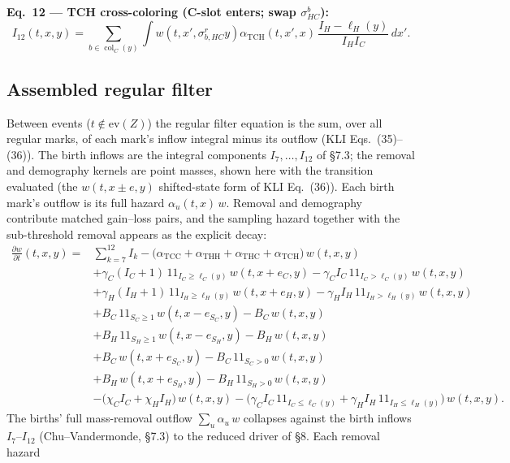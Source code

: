 \documentclass[11pt]{article}
\newcommand{\col}{\operatorname{col}}
\newcommand{\evZ}{\mathrm{ev}(Z)}
\newcommand{\ind}{1\!\!1}
\theoremstyle{plain}
\begin{document}
\textbf{Eq.~12 --- TCH cross-coloring (C-slot enters; swap $\sigma^b_{HC}$):}
\begin{equation}
I_{12}(t,x,y)=\sum_{b\in\col_C(y)}\int w\!\left(t,x',\sigma^r_{b,HC}y\right)\alpha_{\mathrm{TCH}}(t,x',x)\,\frac{I_H-\ell_H(y)}{I_HI_C}\,dx'.
\end{equation}

\subsection{Assembled regular filter}
Between events ($t\notin\evZ$) the regular filter equation is the sum, over all regular marks, of
each mark's inflow integral minus its outflow (KLI Eqs.~(35)--(36)). The birth inflows are the
integral components $I_7,\dots,I_{12}$ of \S7.3; the removal and demography kernels are point masses,
shown here with the transition evaluated (the $w(t,x{\pm}e,y)$ shifted-state form of KLI Eq.~(36)).
Each birth mark's outflow is its full hazard $\alpha_u(t,x)\,w$. Removal and demography contribute matched gain--loss pairs, and
the sampling hazard together with the sub-threshold removal appears as the explicit decay:
\begin{equation}
\begin{aligned}
\frac{\partial w}{\partial t}(t,x,y)={}
&\sum_{k=7}^{12} I_k
-\big(\alpha_{\mathrm{TCC}}+\alpha_{\mathrm{THH}}+\alpha_{\mathrm{THC}}+\alpha_{\mathrm{TCH}}\big)\,w(t,x,y)\\
&+\gamma_C(I_C{+}1)\,\ind_{I_C\ge\ell_C(y)}\,w(t,x{+}e_C,y)
-\gamma_C I_C\,\ind_{I_C>\ell_C(y)}\,w(t,x,y)\\
&+\gamma_H(I_H{+}1)\,\ind_{I_H\ge\ell_H(y)}\,w(t,x{+}e_H,y)
-\gamma_H I_H\,\ind_{I_H>\ell_H(y)}\,w(t,x,y)\\
&+B_C\,\ind_{S_C\ge1}\,w(t,x{-}e_{S_C},y)-B_C\,w(t,x,y)\\
&+B_H\,\ind_{S_H\ge1}\,w(t,x{-}e_{S_H},y)-B_H\,w(t,x,y)\\
&+B_C\,w(t,x{+}e_{S_C},y)-B_C\,\ind_{S_C>0}\,w(t,x,y)\\
&+B_H\,w(t,x{+}e_{S_H},y)-B_H\,\ind_{S_H>0}\,w(t,x,y)\\
&-\big(\chi_C I_C+\chi_H I_H\big)\,w(t,x,y)
-\big(\gamma_C I_C\,\ind_{I_C\le\ell_C(y)}+\gamma_H I_H\,\ind_{I_H\le\ell_H(y)}\big)\,w(t,x,y).
\end{aligned}
\end{equation}
The births' full mass-removal outflow $\sum_u\alpha_u\,w$ collapses against the birth inflows
$I_7$--$I_{12}$ (Chu--Vandermonde, \S7.3) to the reduced driver of \S8. Each removal hazard
\end{document}
